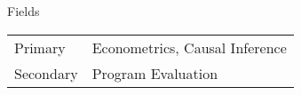 \documentclass{resume} %
\begin{document}

\begin{rSection}{Fields}
\begin{tabular}{@{\hspace{0cm}}ll}
{\sc Primary} & Econometrics, Causal Inference \medskip \\ {\sc Secondary} & Program Evaluation
\end{tabular}
\end{rSection}









\end{document}
